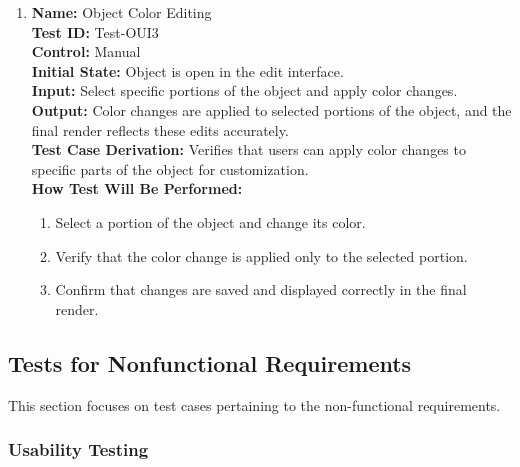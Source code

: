 \documentclass[12pt, titlepage]{article}
\begin{document}
\begin{enumerate}
  \item \textbf{Name:} Object Color Editing \label{itm:Test-OUI3} \\
        \textbf{Test ID:} Test-OUI3 \\
        \textbf{Control:} Manual \\
        \textbf{Initial State:} Object is open in the edit interface. \\
        \textbf{Input:} Select specific portions of the object and apply color changes. \\
        \textbf{Output:} Color changes are applied to selected portions of the object, and the final render reflects these edits accurately. \\
        \textbf{Test Case Derivation:} Verifies that users can apply color changes to specific parts of the object for customization. \\
        \textbf{How Test Will Be Performed:}
        \begin{enumerate}
          \item Select a portion of the object and change its color.
          \item Verify that the color change is applied only to the selected portion.
          \item Confirm that changes are saved and displayed correctly in the final render.
        \end{enumerate}

\end{enumerate}

\subsection{Tests for Nonfunctional Requirements}
This section focuses on test cases pertaining to the non-functional requirements.

\subsubsection{Usability Testing}
\end{document}
